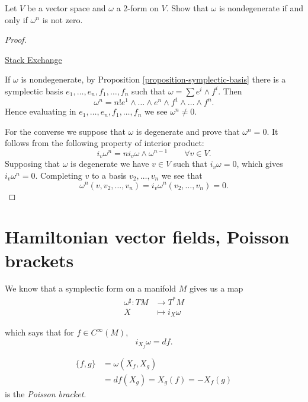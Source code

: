 \begin{exercise}
\label{exercise-omega-power-n}
Let $V$ be a vector space and $\omega$ a
2-form on $V$.
Show that $\omega$ is nondegenerate if and
only if
$\omega^n$ is not zero.
\end{exercise}

\begin{proof}
\begin{reference}
\href{https://math.stackexchange.com/
questions/417365/
how-to-show-omegan-is-a-volume-form-in-a-
symplectic-manifold-m-omega}
{Stack Exchange}
\end{reference}
If $\omega$ is nondegenerate,
by Proposition
\ref{proposition-symplectic-basis}
there is a symplectic basis
$e_1,…,e_n,f_1,…,f_n$
such that $\omega=\sum e^i \wedge f^i$.
Then
$$
\omega^n=n! e^1\wedge…\wedge e^n \wedge
f^1\wedge… \wedge f^n.
$$
Hence evaluating in
$e_1,…,e_n,f_1,…,f_n$
we see $\omega^n\neq 0$.

For the converse we suppose that $\omega$
is degenerate and prove that $\omega^n=0$.
It follows from the following property of
interior product:
$$
i_v\omega^n=n i_v\omega \wedge
\omega^{n-1}\qquad \forall  v \in V.
$$
Supposing that $\omega$ is degenerate we
have $v \in V$ such that $i_v\omega=0$,
which gives $i_v \omega^n=0$.
Completing $v$ to a basis $v_2,…,v_n$
we see that
$$
\omega^n(v,v_2,…,v_n)
=i_v\omega^n(v_2,…,v_n)=0.
$$
\end{proof}

\section{Hamiltonian vector fields, Poisson
brackets}
\label{section-hamil-vecto-field-poiss}

\noindent
We know that a symplectic form on a manifold
$M$ gives us a map
$$
\begin{aligned}
\omega^\sharp: TM &\longrightarrow T^*M \\
X &\longmapsto i_X\omega
\end{aligned}
$$

\noindent
which says that for $f \in C^\infty(M)$,
$$
i_{X_f}\omega=df.
$$
\begin{definition}
\label{definition-poisson-bracket}
$$
\begin{aligned}
\{f,g\}&=\omega(X_f,X_g)\\
&=df(X_g)=X_g(f)=-X_f(g)
\end{aligned}
$$
is the {\it Poisson bracket}.
\end{definition}

